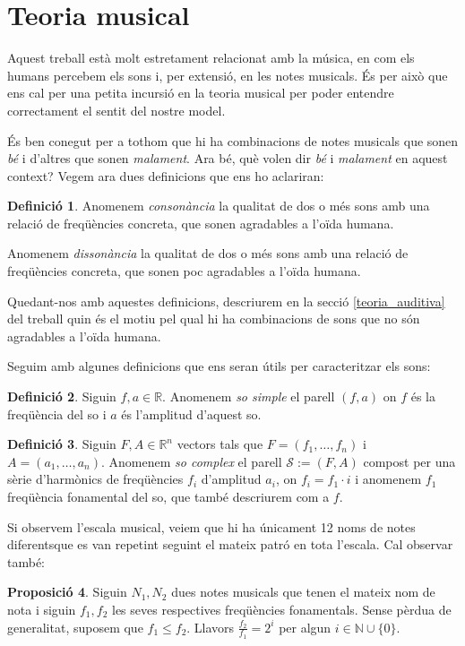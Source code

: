 \documentclass{article}
\theoremstyle{definition}
\newtheorem{definition}{Definició}[section]
\newtheorem{prop}[definition]{Proposició}
\begin{document}
\section{Teoria musical}
Aquest treball està molt estretament relacionat amb la música, en com els humans percebem els sons i, per extensió, en les notes musicals. És per això que ens cal per una petita incursió en la teoria musical per poder entendre correctament el sentit del nostre model.\par
És ben conegut per a tothom que hi ha combinacions de notes musicals que sonen \textit{bé} i d'altres que sonen \textit{malament}. Ara bé, què volen dir \textit{bé} i \textit{malament} en aquest context? Vegem ara dues definicions que ens ho aclariran:
\begin{definition}
Anomenem \textit{consonància} la qualitat de dos o més sons amb una relació de freqüències concreta, que sonen agradables a l'oïda humana.\par
Anomenem \textit{dissonància} la qualitat de dos o més sons amb una relació de freqüències concreta, que sonen poc agradables a l'oïda humana.
\end{definition}
Quedant-nos amb aquestes definicions, descriurem en la secció \ref{teoria_auditiva} del treball quin és el motiu pel qual hi ha combinacions de sons que no són agradables a l'oïda humana.\par
Seguim amb algunes definicions que ens seran útils per caracteritzar els sons:
\begin{definition}
Siguin $f, a \in \mathbb{R}$. Anomenem \textit{so simple} el parell $(f, a)$ on $f$ és la freqüència del so i $a$ és l'amplitud d'aquest so.
\end{definition}
\begin{definition}
Siguin $F, A\in\mathbb{R}^n$ vectors tals que $F=(f_1,\ldots, f_n)$ i $A=(a_1,\ldots, a_n)$. Anomenem \textit{so complex} el parell $\mathcal{S}:=(F, A)$ compost per una sèrie d'harmònics de freqüències $f_i$ d'amplitud $a_i$, on $f_i = f_1 \cdot i$ i anomenem $f_1$ freqüència fonamental del so, que també descriurem com a $f$.
\end{definition}
Si observem l'escala musical, veiem que hi ha únicament 12 noms de notes diferents\footnotemark\space que es van repetint seguint el mateix patró en tota l'escala. Cal observar també:
\begin{prop}
  Siguin $N_1, N_2$ dues notes musicals que tenen el mateix nom de nota i siguin $f_1, f_2$ les seves respectives freqüències fonamentals. Sense pèrdua de generalitat, suposem que $f_1 \leq f_2$. Llavors $\frac{f_{2}}{f_{1}} = 2^i$ per algun $i \in \mathbb{N}\cup\{0\}$.
\end{prop}
\end{document}
